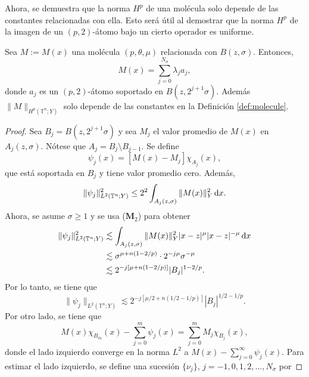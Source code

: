 Ahora, se demuestra que la norma $H^p$ de una molécula solo depende de las constantes relacionadas con ella. Esto será útil al demostrar que la norma $H^p$ de la imagen de un $(p, 2)$-átomo  bajo un cierto operador es uniforme.
\begin{lemma}
	Sea $M:=M(x)$ una molécula $(p, \theta, \mu)$ relacionada con $B(z, \sigma)$. Entonces, 
	\begin{equation*}
		M(x)=\sum_{j=0}^{N_\sigma} \lambda_j a_j,
	\end{equation*}
	donde $a_j$ es un $(p, 2)$-átomo soportado en $B(z, 2^{j+1}\sigma)$. Además $\|M\|_{H^p(\mathbb{T}^n; Y)}$ solo depende de las constantes en la Definición \ref{def:molecule}.
	\label{lem:M-in-Hp}
\end{lemma}

\begin{proof}
	Sea $B_j = B(z, 2^{j+1}\sigma)$ y sea $M_j$ el valor promedio de $M(x)$ en $A_j(z, \sigma)$. Nótese que $A_j = B_j \setminus B_{j-1}$. Se define 
	\begin{equation*}
		\psi_j(x) = [M(x)-M_j]\chi_{A_j}(x),
	\end{equation*}
	que está soportada en $B_j$ y tiene valor promedio cero. Además, 
	\begin{equation*}
		\|\psi_j\|_{L^2(\mathbb{T}^n;Y)}^2 \leq 2^2 \int_{A_j(z,\sigma)}\|M(x)\|_Y^2 \mathop{}\!\mathrm{d} x.
	\end{equation*}
	Ahora, se asume $\sigma\geq1$ y se usa ($\mathbf{M}_2$) para obtener
	\begin{align*}
		\|\psi_j\|_{L^2(\mathbb{T}^n;Y)}^2  & \lesssim \int_{A_j(z,\sigma)}\|M(x)\|_Y^2|x-z|^{\mu} |x-z|^{-\mu} \mathop{}\!\mathrm{d} x
		\\
		 & \lesssim \sigma^{\mu+n(1-2/p)}\cdot2^{-j\mu} \sigma^{-\mu}
		\\
		 & \lesssim 2^{-j[\mu + n(1-2/p)]} |B_j|^{1-2/p}.
	\end{align*}
	Por lo tanto, se tiene que 
	\begin{equation}
		\|\psi_j\|_{L^2(\mathbb{T}^n;Y)} \lesssim 2^{-j[\mu/2 + n(1/2-1/p)]} |B_j|^{1/2-1/p}.
		\label{eq:psi-j}
	\end{equation}
	Por otro lado, se tiene que
	\begin{equation*}
		M(x)\chi_{B_m}(x) - \sum_{j=0}^m\psi_j(x) = \sum_{j=0}^mM_j\chi_{B_j}(x),
	\end{equation*}
	donde el lado izquierdo converge en la norma $L^2$ a $M(x) -\sum_{j=0}^\infty\psi_j(x)$. Para estimar el lado izquierdo, se define una sucesión $\{\nu_j\}$, $j=-1, 0, 1, 2,...,N_\sigma$ por

\end{proof}
